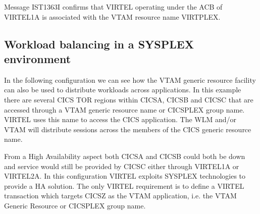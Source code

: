 \documentclass[letterpaper,10pt,english]{sphinxmanual}
\begin{document}
\begin{sphinxVerbatim}[commandchars=\\\{\}]
          
   
         
        
 
        
      
 
\end{sphinxVerbatim}

Message IST1363I confirms that VIRTEL operating under the ACB of VIRTEL1A is associated with the VTAM resource name VIRTPLEX.

\newpage


\subsection{Workload balancing in a SYSPLEX environment}
\label{\detokenize{connectivity_guide:index-172}}\label{\detokenize{connectivity_guide:workload-balancing-in-a-sysplex-environment}}
In the following configuration we can see how the VTAM generic resource facility can also be used to distribute workloads across applications. In this example there are several CICS TOR regions within CICSA, CICSB and CICSC that are accessed through a VTAM generic resource name or CICSPLEX group name. VIRTEL uses this name to access the CICS application. The WLM and/or VTAM will distribute sessions across the members of the CICS generic resource name.


From a High Availability aspect both CICSA and CICSB could both be down and service would still be provided by CICSC either through VIRTEL1A or VIRTEL2A. In this configuration VIRTEL exploits SYSPLEX technologies to provide a HA solution. The only VIRTEL requirement is to define a VIRTEL transaction which targets CICSZ as the VTAM application, i.e. the VTAM
Generic Resource or CICSPLEX group name.
\end{document}
